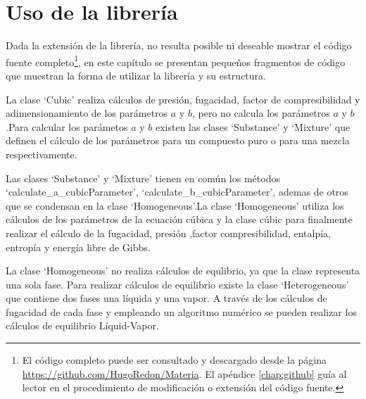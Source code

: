 \chapter{Uso de la librería}\label{chap:libraryUse}
	
	Dada la extensión de la librería, no resulta posible ni deseable mostrar el código fuente completo\footnote{El código completo puede ser consultado y descargado desde la página \url{https://github.com/HugoRedon/Materia}. El apéndice \ref{chap:github} guía al lector en el procedimiento de modificación o extensión del código fuente.}, en este capítulo se presentan pequeños fragmentos de código que muestran la forma de utilizar la librería y su estructura.
		
	La clase `Cubic' realiza cálculos de presión, fugacidad, factor de compresibilidad y adimensionamiento de los parámetros $a$ y $b$, pero no calcula los parámetros $a$ y $b$.Para calcular los parámetos $a$ y $b$ existen las clases `Substance' y `Mixture' que definen el cálculo de los parámetros para un compuesto puro o para una mezcla respectivamente. 

	Las clases `Substance' y `Mixture' tienen en común los métodos `calculate\_a\_cubicParameter', `calculate\_b\_cubicParameter', ademas de otros que se condensan en la clase `Homogeneous'.La clase `Homogeneous' utiliza los cálculos de los parámetros de la ecuación cúbica y la clase cúbic para finalmente realizar el cálculo de la fugacidad, presión ,factor compresibilidad, entalpía, entropía y energía libre de Gibbs.

	La clase `Homogeneous' no realiza cálculos de equlibrio, ya que la clase representa una sola fase. Para realizar cálculos de equilibrio existe la clase `Heterogeneous' que contiene dos fases una líquida y una vapor. A través de los cálculos de fugacidad de cada fase y empleando un algoritmo numérico se pueden realizar los cálculos de equilibrio Líquid-Vapor.



